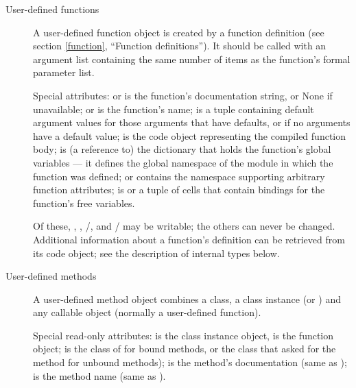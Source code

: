 \begin{description}
\begin{description}
\item[User-defined functions]
A user-defined function object is created by a function definition
(see section \ref{function}, ``Function definitions'').  It should be
called with an argument
list containing the same number of items as the function's formal
parameter list.

Special attributes:  or  is the
function's documentation string, or None if unavailable;
 or  is the function's name;
 is a tuple containing default argument values for
those arguments that have defaults, or  if no arguments
have a default value;  is the code object representing
the compiled function body;  is (a reference to)
the dictionary that holds the function's global variables --- it
defines the global namespace of the module in which the function was
defined;  or  contains the
namespace supporting arbitrary function attributes;
 is  or a tuple of cells that contain
bindings for the function's free variables.

Of these, , , 
/, and
/ may be writable; the
others can never be changed.  Additional information about a
function's definition can be retrieved from its code object; see the
description of internal types below.


\item[User-defined methods]
A user-defined method object combines a class, a class instance (or
) and any callable object (normally a user-defined
function).

Special read-only attributes:  is the class instance
object,  is the function object;
 is the class of  for bound methods,
or the class that asked for the method for unbound methods);
 is the method's documentation (same as
);  is the method name (same as
).


\end{description}
\end{description}
